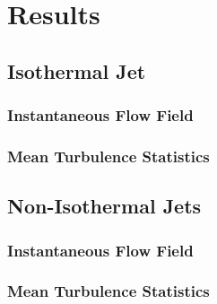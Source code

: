 \chapter{Results}


\section{Isothermal Jet}
\subsection{Instantaneous Flow Field}
\subsection{Mean Turbulence Statistics}
\section{Non-Isothermal Jets}
\subsection{Instantaneous Flow Field}
\subsection{Mean Turbulence Statistics}



